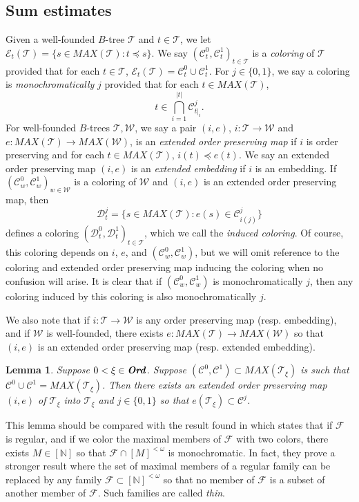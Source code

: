 \documentclass[12pt]{amsart}
\newtheorem{lemma}[theorem]{Lemma}
\theoremstyle{definition}
\newcommand{\fin}{[\mathbb{N}]^{<\omega}}
\newcommand{\infin}{[\mathbb{N}]}
\newcommand{\ord}{\textbf{Ord}}
\newcommand{\ddd}{\mathcal{D}}
\newcommand{\ccc}{\mathcal{C}}
\newcommand{\eee}{\mathcal{E}}
\newcommand{\fff}{\mathcal{F}}
\newcommand{\ttt}{\mathcal{T}}
\newcommand{\www}{\mathcal{W}}
\begin{document}
\subsection{Sum estimates}

Given a well-founded $B$-tree $\ttt$ and $t\in \ttt$, we let $\eee_t(\ttt)=\{s\in MAX(\ttt): t\preceq s\}$.  We say $(\ccc^0_t, \ccc^1_t)_{t\in\ttt}$ is a \emph{coloring} of $\ttt$ provided that for each $t\in \ttt$, $\eee_t(\ttt)=\ccc^0_t\cup \ccc^1_t$.  For $j\in \{0,1\}$, we say a coloring is \emph{monochromatically} $j$ provided that for each $t\in MAX(\ttt)$, $$t\in \bigcap_{i=1}^{|t|} \ccc^j_{t|_i}.$$  For well-founded $B$-trees $\ttt, \www$, we say a pair $(i,e)$, $i:\ttt\to\www$ and $e:MAX(\ttt)\to MAX(\www)$, is an \emph{extended order preserving map} if $i$ is order preserving and for each $t\in MAX(\ttt)$, $i(t)\preceq e(t)$.  We say an extended order preserving map $(i,e)$ is an \emph{extended embedding} if $i$ is an embedding.  If $(\ccc^0_w, \ccc^1_w)_{w\in \www}$ is a coloring of $\www$ and $(i,e)$ is an extended order preserving map, then $$\ddd^j_t=\{s\in MAX(\ttt): e(s)\in \ccc^j_{i(j)}\}$$  defines a coloring $(\ddd^0_t, \ddd^1_t)_{t\in \ttt}$, which we call the \emph{induced coloring}.  Of course, this coloring depends on $i$, $e$, and $(\ccc^0_w, \ccc^1_w)$, but we will omit reference to the coloring and extended order preserving map inducing the coloring when no confusion will arise.  It is clear that if $(\ccc^0_w, \ccc^1_w)$ is monochromatically $j$, then any coloring induced by this coloring is also monochromatically $j$. 

We also note that if $i:\ttt\to \www$ is any order preserving map (resp. embedding), and if $\www$ is well-founded, there exists $e:MAX(\ttt)\to MAX(\www)$ so that $(i,e)$ is an extended order preserving map (resp. extended embedding).  

\begin{lemma} Suppose $0<\xi\in \emph{\ord}$.  Suppose $(\ccc^0, \ccc^1)\subset MAX(\ttt_\xi)$ is such that $\ccc^0\cup \ccc^1=MAX(\ttt_\xi)$.  Then there exists an extended order preserving map $(i,e)$ of $\ttt_\xi$ into $\ttt_\xi$ and $j\in \{0,1\}$ so that $e(\ttt_\xi)\subset \ccc^j$.    

\label{successor step}

\end{lemma}

This lemma should be compared with the result found in \cite{PR} which states that if $\fff$ is regular, and if we color the maximal members of $\fff$ with two colors, there exists $M\in \infin$ so that $\fff\cap [M]^{<\omega}$ is monochromatic. In fact, they prove a stronger result where the set of maximal members of a regular family can be replaced by any family $\fff\subset \fin$ so that no member of $\fff$ is a subset of another member of $\fff$.  Such families are called \emph{thin}.  
\end{document}
